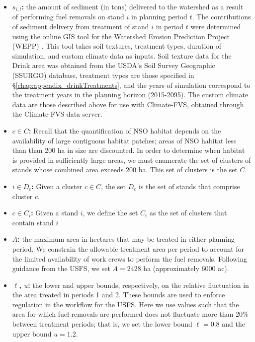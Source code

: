 \begin{itemize}
\item \textbf{$s_{i,t}$:} the amount of sediment (in tons) delivered to the watershed as a result of performing fuel removals on stand $i$ in planning period $t$. The contributions of sediment delivery from treatment of stand $i$ in period $t$ were determined using the online GIS tool for the Watershed Erosion Prediction Project (WEPP) \cite{frankenberger2011development}. This tool takes soil textures, treatment types, duration of simulation, and custom climate data as inputs. Soil texture data for the Drink area was obtained from the USDA's Soil Survey Geographic (SSURGO) database, treatment types are those specified in \S \ref{chap:appendix_drinkTreatments}, and the years of simulation correspond to the treatment years in the planning horizon (2015-2095). The custom climate data are those described above for use with Climate-FVS, obtained through the Climate-FVS data server.

\item \textbf{$c \in C$:} Recall that the quantification of NSO habitat depends on the availability of large contiguous habitat patches; areas of NSO habitat less than than 200 ha in size are discounted. In order to determine when habitat is provided in sufficiently large areas, we must enumerate the set of clusters of stands whose combined area exceeds 200 ha. This set of clusters is the set $C$.

\item \textbf{$i \in D_c$:} Given a cluster $c \in C$, the set $D_c$ is the set of stands that comprise cluster $c$.

\item \textbf{$c \in C_i$:} Given a stand $i$, we define the set $C_i$ as the set of clusters that contain stand $i$

\item \textbf{$A$:} the maximum area in hectares that may be treated in either planning period. We constrain the allowable treatment area per period to account for the limited availability of work crews to perform the fuel removals. Following guidance from the USFS, we set $A = 2428$ ha (approximately 6000 ac).

\item \textbf{$\ell$, $u$:} the lower and upper bounds, respectively, on the relative fluctuation in the area treated in periods 1 and 2. These bounds are used to enforce regulation in the workflow for the USFS. Here we use values such that the area for which fuel removals are performed does not fluctuate more than 20\% between treatment periods; that is, we set the lower bound $\ell = 0.8$ and the upper bound $u = 1.2$.
\end{itemize}

